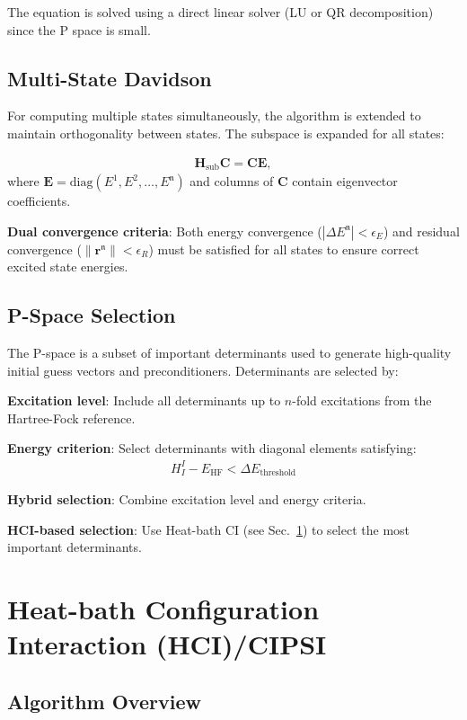 \documentclass[a4paper,12pt,oneside]{book}
\newcommand{\beq}{\begin{equation}\begin{aligned}}
\newcommand{\eeq}{\end{aligned}\end{equation}}
\newcommand{\mat}{\mathbf}
\newcommand{\vect}{\mathbf}
\newcommand{\sect}[1]{Sec.~\ref{#1}}
\newcommand{\st}[1]{\mathfrak{#1}}
\begin{document}
The equation is solved using a direct linear solver (LU or QR decomposition) since the P space is small.

\subsection{Multi-State Davidson}

For computing multiple states simultaneously, the algorithm is extended to maintain 
orthogonality between states. The subspace is expanded for all states:

\beq
\mat{H}_{\text{sub}} \mat{C} = \mat{C} \mat{E},
\eeq
where $\mat{E} = \text{diag}(E^\st{1}, E^\st{2}, \ldots, E^\st{n})$ and columns of $\mat{C}$ contain 
eigenvector coefficients.

\textbf{Dual convergence criteria}: Both energy convergence ($|\Delta E^\st{n}| \lt \epsilon_E$) 
and residual convergence ($\|\vect{r}^\st{n}\| \lt \epsilon_R$) must be satisfied for all states 
to ensure correct excited state energies.


\subsection{P-Space Selection}
\label{sec:pspace}

The P-space is a subset of important determinants used to generate high-quality initial 
guess vectors and preconditioners. Determinants are selected by:

\textbf{Excitation level}: Include all determinants up to $n$-fold excitations from the 
Hartree-Fock reference.

\textbf{Energy criterion}: Select determinants with diagonal elements satisfying:
\beq
H_{I}^{I} - E_{\text{HF}} \lt \Delta E_{\text{threshold}}
\eeq

\textbf{Hybrid selection}: Combine excitation level and energy criteria.

\textbf{HCI-based selection}: Use Heat-bath CI (see \sect{sec:hci}) to select the 
most important determinants.

\section{Heat-bath Configuration Interaction (HCI)/CIPSI}
\label{sec:hci}

\subsection{Algorithm Overview}
\end{document}
